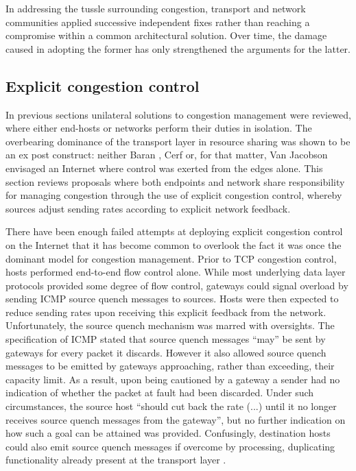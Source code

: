 In addressing the tussle surrounding congestion, transport and network communities applied successive independent fixes rather than reaching a compromise within a common architectural solution.
Over time, the damage caused in adopting the former has only strengthened the arguments for the latter.

\subsection{Explicit congestion control}
\label{sec:resourcepooling:xcc}

In previous sections unilateral solutions to congestion management were reviewed, where either end-hosts or networks perform their duties in isolation. 
The overbearing dominance of the transport layer in resource sharing was shown to be an ex post construct:
neither Baran \cite{Baran:1964p453}, Cerf \cite{Cerf:2005p452} or, for that matter, Van Jacobson \cite{Jacobson:1988p398} envisaged an Internet where control was exerted from the edges alone.
This section reviews proposals where both endpoints and network share responsibility for managing congestion through the use of explicit congestion control, whereby sources adjust sending rates according to explicit network feedback.

There have been enough failed attempts at deploying explicit congestion control on the Internet that it has become common to overlook the fact it was once the dominant model for congestion management.
Prior to \ac{TCP} congestion control, hosts performed end-to-end flow control alone. 
While most underlying data layer protocols provided some degree of flow control, gateways could signal overload by sending \ac{ICMP} source quench messages to sources.
Hosts were then expected to reduce sending rates upon receiving this explicit feedback from the network.
Unfortunately, the source quench mechanism was marred with oversights.
The specification of \acs{ICMP}\cite{Postel:1981p463} stated that source quench messages ``may'' be sent by gateways for every packet it discards.
However it also allowed source quench messages to be emitted by gateways approaching, rather than exceeding, their capacity limit.
As a result, upon being cautioned by a gateway a sender had no indication of whether the packet at fault had been discarded.
Under such circumstances, the source host ``should cut back the rate (...) until it no longer receives source quench messages from the gateway'',
but no further indication on how such a goal can be attained was provided.
Confusingly, destination hosts could also emit source quench messages if overcome by processing, duplicating functionality already present at the transport layer \cite{Postel:1980p445}.

